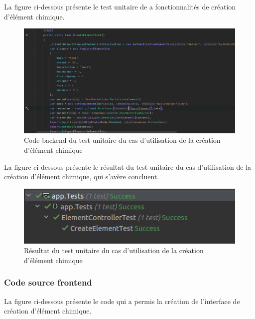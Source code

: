 La figure ci-dessous présente le test unitaire de a fonctionnalités de création d'élément chimique.

\begin{figure}[H]
	\centering
	\includegraphics[width=1\textwidth]{img/cet}
	\caption{Code backend du test unitaire du cas d'utilisation de la création d'élément chimique}
	\label{fig:mesh1}
\end{figure}

La figure ci-dessous présente le résultat du test unitaire du cas d'utilisation de la création d'élément chimique, qui s'avère concluent.

\begin{figure}[H]
	\centering
	\includegraphics[width=1\textwidth]{img/ute}
	\caption{Résultat du test unitaire du cas d'utilisation de la création d'élément chimique}
	\label{fig:mesh1}
\end{figure}

\subsubsection{Code source frontend}

La figure ci-dessous présente le code qui a permis la création de l'interface de création d'élément chimique.

